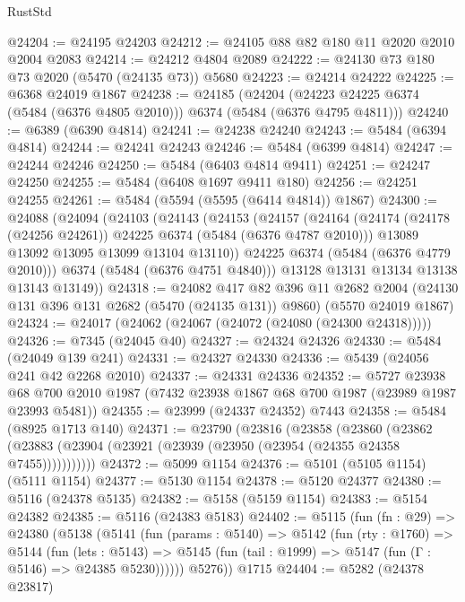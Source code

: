 \begin{lexlean}{RustStd}
\begin{coremodule}
@24204 := @24195 @24203
@24212 := @24105 @88 @82 @180 @11 @2020 @2010 @2004 @2083
@24214 := @24212 @4804 @2089
@24222 := @24130 @73 @180 @73 @2020 (@5470 (@24135 @73)) @5680
@24223 := @24214 @24222
@24225 := @6368 @24019 @1867
@24238 := @24185
    (@24204 (@24223 @24225 @6374 (@5484 (@6376 @4805 @2010))) @6374 (@5484 (@6376 @4795 @4811)))
@24240 := @6389 (@6390 @4814)
@24241 := @24238 @24240
@24243 := @5484 (@6394 @4814)
@24244 := @24241 @24243
@24246 := @5484 (@6399 @4814)
@24247 := @24244 @24246
@24250 := @5484 (@6403 @4814 @9411)
@24251 := @24247 @24250
@24255 := @5484 (@6408 @1697 @9411 @180)
@24256 := @24251 @24255
@24261 := @5484 (@5594 (@5595 (@6414 @4814)) @1867)
@24300 := @24088
    (@24094
      (@24103
        (@24143
          (@24153
            (@24157
              (@24164
                (@24174 (@24178 (@24256 @24261)) @24225 @6374 (@5484 (@6376 @4787 @2010)))
                @13089
                @13092
                @13095
                @13099
                @13104
                @13110))
            @24225
            @6374
            (@5484 (@6376 @4779 @2010)))
          @6374
          (@5484 (@6376 @4751 @4840)))
        @13128
        @13131
        @13134
        @13138
        @13143
        @13149))
@24318 := @24082
    @417
    @82
    @396
    @11
    @2682
    @2004
    (@24130 @131 @396 @131 @2682 (@5470 (@24135 @131)) @9860)
    (@5570 @24019 @1867)
@24324 := @24017 (@24062 (@24067 (@24072 (@24080 (@24300 @24318)))))
@24326 := @7345 (@24045 @40)
@24327 := @24324 @24326
@24330 := @5484 (@24049 @139 @241)
@24331 := @24327 @24330
@24336 := @5439 (@24056 @241 @42 @2268 @2010)
@24337 := @24331 @24336
@24352 := @5727
    @23938
    @68
    @700
    @2010
    @1987
    (@7432 @23938 @1867 @68 @700 @1987 (@23989 @1987 @23993 @5481))
@24355 := @23999 (@24337 @24352) @7443
@24358 := @5484 (@8925 @1713 @140)
@24371 := @23790
    (@23816
      (@23858
        (@23860
          (@23862 (@23883 (@23904 (@23921 (@23939 (@23950 (@23954 (@24355 @24358 @7455)))))))))))
@24372 := @5099 @1154
@24376 := @5101 (@5105 @1154) (@5111 @1154)
@24377 := @5130 @1154
@24378 := @5120 @24377
@24380 := @5116 (@24378 @5135)
@24382 := @5158 (@5159 @1154)
@24383 := @5154 @24382
@24385 := @5116 (@24383 @5183)
@24402 := @5115
    (fun (fn : @29) =>
    @24380
      (@5138
        (@5141
          (fun (params : @5140) =>
          @5142
            (fun (rty : @1760) =>
            @5144
              (fun (lets : @5143) =>
              @5145 (fun (tail : @1999) => @5147 (fun (Γ : @5146) => @24385 @5230))))))
        @5276))
    @1715
@24404 := @5282 (@24378 @23817)

\end{coremodule}
\end{lexlean}
